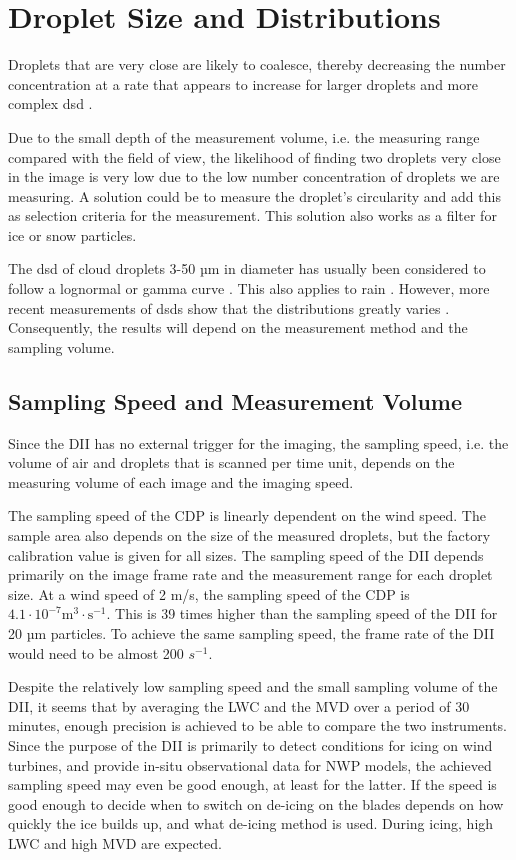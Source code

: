 \section{Droplet Size and Distributions}

Droplets that are very close are likely to coalesce, thereby decreasing the number concentration at a rate that appears to increase for larger droplets and more complex \gls{dsd} \cite{borda2011}. 

Due to the small depth of the measurement volume, i.e. the measuring range compared with the field of view, the likelihood of finding two droplets very close in the image is very low due to the low number concentration of droplets we are measuring. A solution could be to measure the droplet’s circularity and add this as selection criteria for the measurement. This solution also works as a filter for ice or snow particles. 

The \gls{dsd} of cloud droplets 3-50 µm in diameter has usually been considered to follow a lognormal or gamma curve \cite{miles2000,lee2010,sein1998}. This also applies to rain \cite{ulb1983}. However, more recent measurements of \gls{dsd}s show that the distributions greatly varies \cite{james2001,shaw2002,peters2005,cob2011}. Consequently, the results will depend on the measurement method and the sampling volume.

\subsection{Sampling Speed and Measurement Volume}

Since the DII has no external trigger for the imaging, the sampling speed, i.e. the volume of air and droplets that is scanned per time unit, depends on the measuring volume of each image and the imaging speed. 

The sampling speed of the CDP is linearly dependent on the wind speed. The sample area also depends on the size of the measured droplets, but the factory calibration value is given for all sizes. The sampling speed of the DII depends primarily on the image frame rate and the measurement range for each droplet size. At a wind speed of 2 m/s, the sampling speed of the CDP is $\mathrm{4.1 \cdot 10^{-7} m^{3} \cdot s^{-1}}$. This is 39 times higher than the sampling speed of the DII for 20 µm particles. To achieve the same sampling speed, the frame rate of the DII would need to be almost 200 $s^{-1}$. 

Despite the relatively low sampling speed and the small sampling volume of the DII, it seems that by averaging the LWC and the MVD over a period of 30 minutes, enough precision is achieved to be able to compare the two instruments. Since the purpose of the DII is primarily to detect conditions for icing on wind turbines, and provide in-situ observational data for NWP models, the achieved sampling speed may even be good enough, at least for the latter. If the speed is good enough to decide when to switch on de-icing on the blades depends on how quickly the ice builds up, and what de-icing method is used. During icing, high LWC and high MVD are expected.


